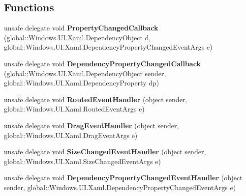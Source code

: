 \subsection*{Functions}
\begin{DoxyCompactItemize}
\item 
\mbox{\label{namespace_windows_1_1_u_i_1_1_xaml_ab4a905d3b5e439ae21f981bf33bd5968}} 
unsafe delegate void {\bfseries Property\+Changed\+Callback} (global\+::\+Windows.\+U\+I.\+Xaml.\+Dependency\+Object d, global\+::\+Windows.\+U\+I.\+Xaml.\+Dependency\+Property\+Changed\+Event\+Args e)
\item 
\mbox{\label{namespace_windows_1_1_u_i_1_1_xaml_ac6da35f25f53190c8b0b9925e0d6c97e}} 
unsafe delegate void {\bfseries Dependency\+Property\+Changed\+Callback} (global\+::\+Windows.\+U\+I.\+Xaml.\+Dependency\+Object sender, global\+::\+Windows.\+U\+I.\+Xaml.\+Dependency\+Property dp)
\item 
\mbox{\label{namespace_windows_1_1_u_i_1_1_xaml_a9b5ae5f2f764588784c61689c030b957}} 
unsafe delegate void {\bfseries Routed\+Event\+Handler} (object sender, global\+::\+Windows.\+U\+I.\+Xaml.\+Routed\+Event\+Args e)
\item 
\mbox{\label{namespace_windows_1_1_u_i_1_1_xaml_afec61648f1e6d2ef7fb6f9e81951b31f}} 
unsafe delegate void {\bfseries Drag\+Event\+Handler} (object sender, global\+::\+Windows.\+U\+I.\+Xaml.\+Drag\+Event\+Args e)
\item 
\mbox{\label{namespace_windows_1_1_u_i_1_1_xaml_ab3155b477a8f6b182365c556f657368d}} 
unsafe delegate void {\bfseries Size\+Changed\+Event\+Handler} (object sender, global\+::\+Windows.\+U\+I.\+Xaml.\+Size\+Changed\+Event\+Args e)
\item 
\mbox{\label{namespace_windows_1_1_u_i_1_1_xaml_ae065acb616cf79f6f4cb501fb9e94fa3}} 
unsafe delegate void {\bfseries Dependency\+Property\+Changed\+Event\+Handler} (object sender, global\+::\+Windows.\+U\+I.\+Xaml.\+Dependency\+Property\+Changed\+Event\+Args e)
\item 
\mbox{\label{namespace_windows_1_1_u_i_1_1_xaml_a43793547dcb0e49633bbba765ee9c0e9}} 

\end{DoxyCompactItemize}
